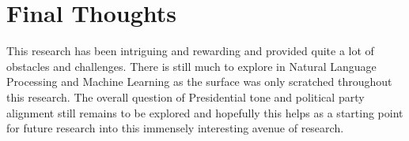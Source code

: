 \section{Final Thoughts}
This research has been intriguing and rewarding and provided quite a lot of obstacles and challenges.
There is still much to explore in Natural Language Processing and Machine Learning as the surface was only scratched throughout this research.
The overall question of Presidential tone and political party alignment still remains to be explored and hopefully this helps as a starting point for future research into this immensely interesting avenue of research.